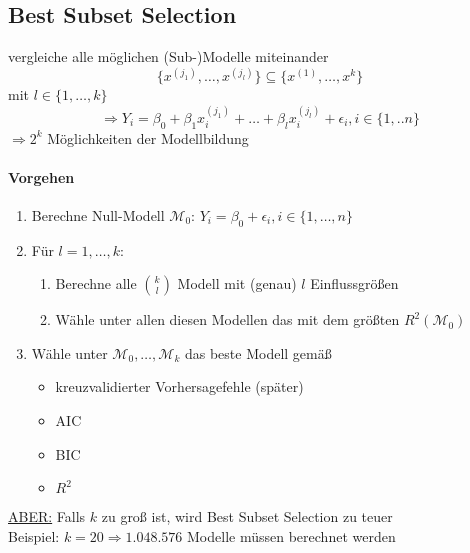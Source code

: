 \documentclass[10pt,a4paper]{article}
\begin{document}
\subsection{Best Subset Selection}
vergleiche alle möglichen (Sub-)Modelle miteinander
\[ \{ x^{(j_1)},\dots, x^{(j_l)}\} \subseteq \{x^{(1)}, \dots, x^{k} \} \]
mit 
$l \in \{1, \dots, k \} $
\[ \Rightarrow Y_i = \beta_0 + \beta_1 x_i^{(j_1)} + \dots + \beta_l x_i^{(j_l)} + \epsilon_i , i \in \{1,..n\} \]
$\Rightarrow 2^{k} $ Möglichkeiten der Modellbildung
\paragraph{Vorgehen}
\begin{enumerate}
	\item Berechne Null-Modell $\mathcal{M}_0 $:
		$Y_i= \beta_0 + \epsilon_i , i \in \{1,\dots,n\} $
	\item Für $l=1,\dots,k$:
		\begin{enumerate}
			\item Berechne alle $\binom{k}{l}$ Modell mit (genau) $l$ Einflussgrößen
			\item Wähle unter allen diesen Modellen das mit dem größten $R^{2} (\mathcal{M}_0)$
		\end{enumerate}
	\item Wähle unter $\mathcal{M}_0,\dots,\mathcal{M}_k$ das beste Modell gemäß
		\begin{itemize}
			\item kreuzvalidierter Vorhersagefehle (später)
			\item AIC
			\item BIC
			\item $R^2$
		\end{itemize}
\end{enumerate}
\underline{ABER:} Falls $k$ zu groß ist, wird Best Subset Selection zu teuer \\
Beispiel: $k=20 \Rightarrow 1.048.576$ Modelle müssen berechnet werden
\end{document}
